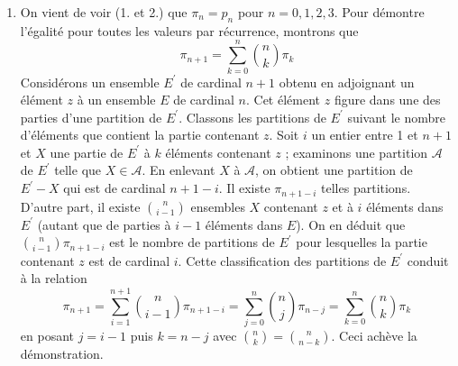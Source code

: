 \begin{enumerate}
\item  On vient de voir (1. et 2.) que $\pi _{n}=p_{n}$ pour $n=0,1,2,3$.
Pour d{\'e}montre l'{\'e}galit{\'e} pour toutes les valeurs par
r{\'e}currence, montrons que
\[
\pi _{n+1}=\sum_{k=0}^{n}\binom{n}{k}\pi _{k}
\]
Consid{\'e}rons un ensemble $E^{\prime }$ de cardinal $n+1$ obtenu en
adjoignant un {\'e}l{\'e}ment $z$ {\`a} un ensemble $E$ de cardinal $n$. Cet
{\'e}l{\'e}ment $z$ figure dans une des parties d'une partition de $%
E^{\prime }$. Classons les partitions de $E^{\prime }$ suivant le nombre
d'{\'e}l{\'e}ments que contient la partie contenant $z$.\newline
Soit $i$ un entier entre 1 et $n+1$ et $X$ une partie de $E^{\prime }$ {\`a}
$k$ {\'e}l{\'e}ments contenant $z$ ; examinons une partition $\mathcal{A}$
de $E^{\prime }$ telle que $X\in \mathcal{A}$.\newline
En enlevant $X$ {\`a} $\mathcal{A}$, on obtient une partition de $E^{\prime
}-X$ qui est de cardinal $n+1-i$. Il existe $\pi _{n+1-i}$ telles partitions.%
\newline
D'autre part, il existe $\binom{n}{i-1}$ ensembles $X$ contenant $z$ et
{\`a} $i$ {\'e}l{\'e}ments dans $E^{\prime }$ (autant que de parties {\`a} $%
i-1$ {\'e}l{\'e}ments dans $E$). On en d{\'e}duit que $\binom{n}{i-1}\pi
_{n+1-i}$ est le nombre de partitions de $E^{\prime }$ pour lesquelles la
partie contenant $z$ est de cardinal $i$. Cette classification des
partitions de $E^{\prime }$ conduit {\`a} la relation
\[
\pi _{n+1}=\sum_{i=1}^{n+1}\binom{n}{i-1}\pi _{n+1-i}=\sum_{j=0}^{n}\binom{n%
}{j}\pi _{n-j}=\sum_{k=0}^{n}\binom{n}{k}\pi _{k}
\]
en posant $j=i-1$ puis $k=n-j$ avec $\binom{n}{k}=\binom{n}{n-k}$. Ceci
ach{\`e}ve la d{\'e}monstration.
\end{enumerate}
